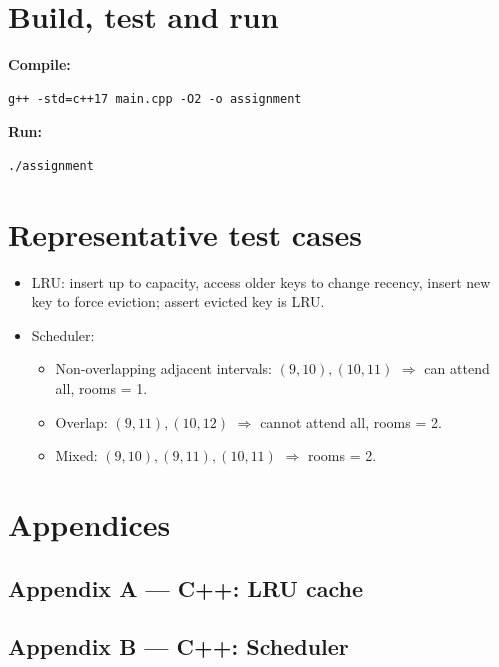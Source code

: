\documentclass[11pt,a4paper]{article}
\begin{document}
\section{Build, test and run}
\begin{tcolorbox}[mybox]
\textbf{Compile:}
\begin{verbatim}
g++ -std=c++17 main.cpp -O2 -o assignment
\end{verbatim}
\textbf{Run:}
\begin{verbatim}
./assignment
\end{verbatim}
\end{tcolorbox}

\section{Representative test cases}
\begin{itemize}
  \item LRU: insert up to capacity, access older keys to change recency, insert new key to force eviction; assert evicted key is LRU.
  \item Scheduler:
    \begin{itemize}
      \item Non-overlapping adjacent intervals: \((9,10),(10,11)\) $\Rightarrow$ can attend all, rooms = 1.
      \item Overlap: \((9,11),(10,12)\) $\Rightarrow$ cannot attend all, rooms = 2.
      \item Mixed: \((9,10),(9,11),(10,11)\) $\Rightarrow$ rooms = 2.
    \end{itemize}
\end{itemize}

\newpage
\section*{Appendices}

\subsection*{Appendix A — C++: LRU cache}


\subsection*{Appendix B — C++: Scheduler}

\end{document}
